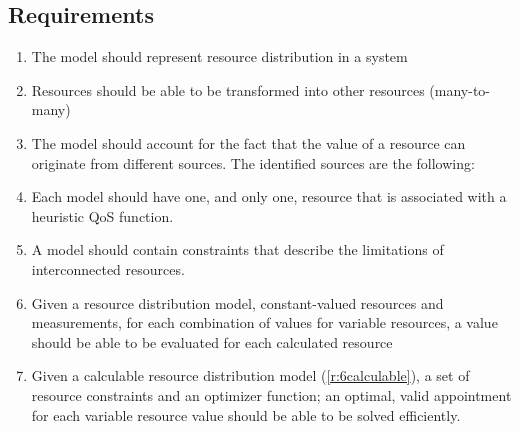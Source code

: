 \subsection{Requirements}
\begin{enumerate}[label=R\rdmid .\arabic*]
\nospace
\item \label{r:1main} The model should represent resource distribution in a system
\item \label{r:2transform} Resources should be able to be transformed into other resources (many-to-many)
\item \label{r:3resource_types} The model should account for the fact that the value of a resource can originate from different sources. The identified sources are the following:
\item \label{r:4optimizer} Each model should have one, and only one, resource that is associated with a heuristic QoS function.
\item \label{r:5constraint} A model should contain constraints that describe the limitations of interconnected resources.
\item \label{r:6calculable}Given a resource distribution model, constant-valued resources and measurements, for each combination of values for variable resources, a value should be able to be evaluated for each calculated resource
\item \label{r:7solvable} Given a calculable  resource distribution model (\ref{r:6calculable}), a set of resource constraints and an optimizer function; an optimal, valid appointment for each variable resource value should be able to be solved efficiently.
\end{enumerate}

